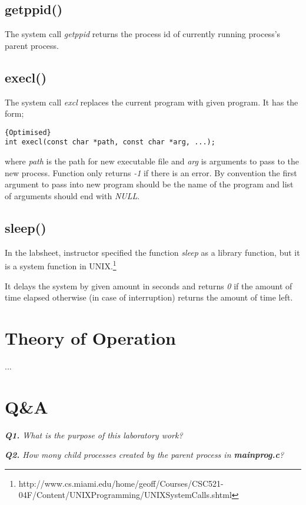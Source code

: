 \documentclass[11pt]{article}
\begin{document}
\subsection*{getppid()}
The system call \textit{getppid} returns the process id of currently running process's parent process.

\subsection*{execl()}
The system call \textit{excl} replaces the current program with given program. It has the form;

\begin{lstlisting}[frame=tlrb]{Optimised}
int execl(const char *path, const char *arg, ...);
\end{lstlisting}

where \textit{path} is the path for new executable file and \textit{arg} is arguments to pass to the new process. Function only returns \textit{-1} if there is an error. By convention the first argument to pass into new program should be the name of the program and list of arguments should end with \textit{NULL}.

\subsection*{sleep()}
In the labsheet, instructor specified the function \textit{sleep} as a library function, but it is a system function in UNIX.\footnote{http://www.cs.miami.edu/home/geoff/Courses/CSC521-04F/Content/UNIXProgramming/UNIXSystemCalls.shtml}

It delays the system by given amount in seconds and returns \textit{0} if the amount of time elapsed otherwise (in case of interruption) returns the amount of time left.

\section*{Theory of Operation}
...
\section*{Q\&A}

\textit{\textbf{Q1.} What is the purpose of this laboratory work?}
\vspace{3mm}


\vspace{3mm}
\textit{\textbf{Q2.} How mony child processes created by the parent process in \textbf{mainprog.c}?}
\vspace{3mm}
\end{document}

